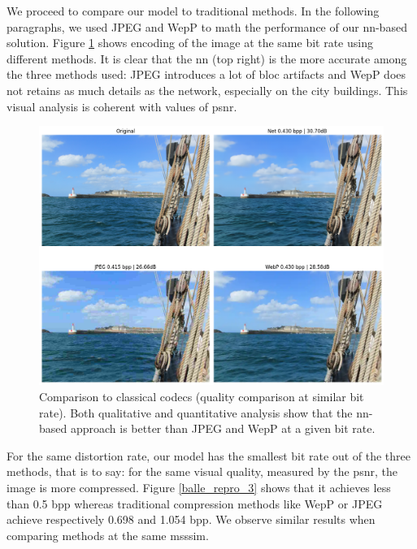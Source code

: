 We proceed to compare our model to traditional methods. In the following paragraphs, we used JPEG and WepP to math the performance of our \acrshort{nn}-based solution. Figure \ref{balle_repro_2} shows encoding of the image at the same bit rate using different methods. It is clear that the \acrshort{nn} (top right) is the more accurate among the three methods used: JPEG introduces a lot of bloc artifacts and WepP does not retains as much details as the network, especially on the city buildings. This visual analysis is coherent with values of \acrshort{psnr}.

\begin{figure}
    \centering
    \includegraphics[width=15cm]{../img/balle_repro_bpp.png}
    \caption[Comparison to classical codecs (quality comparison at similar bit rate).]{Comparison to classical codecs (quality comparison at similar bit rate). Both qualitative and quantitative analysis show that the \acrshort{nn}-based approach is better than JPEG and WepP at a given bit rate.}
    \label{balle_repro_2}
\end{figure}

For the same distortion rate, our model has the smallest bit rate out of the three methods, that is to say: for the same visual quality, measured by the \acrshort{psnr}, the image is more compressed. Figure \ref{balle_repro_3} shows that it achieves less than 0.5 \acrshort{bpp} whereas traditional compression methods like WepP or JPEG achieve respectively 0.698 and 1.054 \acrshort{bpp}. We observe similar results when comparing methods at the same \acrshort{msssim}.

